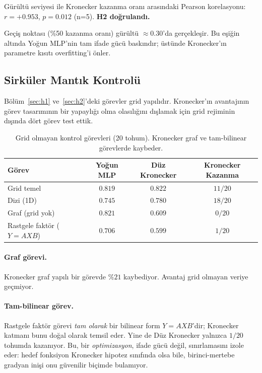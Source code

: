\documentclass[11pt,a4paper]{article}
\begin{document}
Gürültü seviyesi ile Kronecker kazanma oranı arasındaki Pearson
korelasyonu: $r = +0.953$, $p = 0.012$ (n=5). \textbf{H2
doğrulandı.}

Geçiş noktası (\%50 kazanma oranı) gürültü $\approx 0.30$'da
gerçekleşir. Bu eşiğin altında Yoğun MLP'nin tam ifade gücü
baskındır; üstünde Kronecker'ın parametre kısıtı overfitting'i
önler.


\subsection{Sirküler Mantık Kontrolü}
\label{sec:non-grid}

Bölüm~\ref{sec:h1} ve~\ref{sec:h2}'deki görevler grid yapılıdır.
Kronecker'ın avantajının görev tasarımının bir yapaylığı olma
olasılığını dışlamak için grid rejiminin dışında dört görev test
ettik.

\begin{table}[h]
\centering
\caption{Grid olmayan kontrol görevleri (20 tohum). Kronecker graf
ve tam-bilinear görevlerde kaybeder.}
\label{tab:non-grid}
\small
\begin{tabular}{lccc}
\toprule
Görev & Yoğun MLP & Düz Kronecker & Kronecker Kazanma \\
\midrule
Grid temel                & $0.819$ & $0.822$ & $11/20$ \\
Dizi (1D)                 & $0.745$ & $\mathbf{0.780}$ & $18/20$ \\
Graf (grid yok)           & $\mathbf{0.821}$ & $0.609$ & $0/20$ \\
Rastgele faktör ($Y=AXB$) & $\mathbf{0.706}$ & $0.599$ & $1/20$ \\
\bottomrule
\end{tabular}
\end{table}

\paragraph{Graf görevi.}
Kronecker graf yapılı bir görevde $\%21$ kaybediyor. Avantaj
grid olmayan veriye geçmiyor.

\paragraph{Tam-bilinear görev.}
Rastgele faktör görevi \emph{tam olarak} bir bilinear form
$Y = AXB$'dir; Kronecker katmanı bunu doğal olarak temsil eder.
Yine de Düz Kronecker yalnızca $1/20$ tohumda kazanıyor. Bu,
bir \emph{optimizasyon}, ifade gücü değil, sınırlamasını izole
eder: hedef fonksiyon Kronecker hipotez sınıfında olsa bile,
birinci-mertebe gradyan inişi onu güvenilir biçimde bulamıyor.
\end{document}
